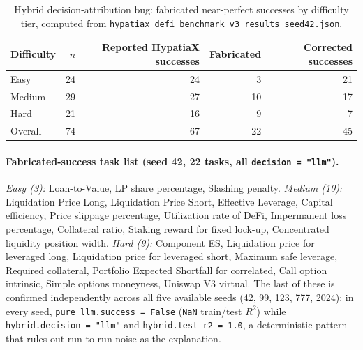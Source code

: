 \documentclass[twoside,11pt]{article}
\newcommand{\Rsq}{R^{2}}
\begin{document}
\begin{table}[h]
\centering
\caption{Hybrid decision-attribution bug: fabricated near-perfect successes by
difficulty tier, computed from \texttt{hypatiax\_defi\_benchmark\_v3\_results\_seed42.json}.}
\label{tab:hybrid-bug-breakdown}
\begin{tabular}{lrrrr}
\toprule
Difficulty & $n$ & Reported HypatiaX successes & Fabricated & Corrected successes \\
\midrule
Easy    & 24 & 24 & 3 & 21 \\
Medium  & 29 & 27 & 10 & 17 \\
Hard    & 21 & 16 & 9 & 7 \\
\midrule
Overall & 74 & 67 & 22 & 45 \\
\bottomrule
\end{tabular}
\end{table}

\paragraph{Fabricated-success task list (seed 42, 22 tasks, all
\texttt{decision = "llm"}).} \emph{Easy (3):} Loan-to-Value, LP share
percentage, Slashing penalty. \emph{Medium (10):} Liquidation Price Long,
Liquidation Price Short, Effective Leverage, Capital efficiency, Price
slippage percentage, Utilization rate of DeFi, Impermanent loss percentage,
Collateral ratio, Staking reward for fixed lock-up, Concentrated liquidity
position width. \emph{Hard (9):} Component ES, Liquidation price for
leveraged long, Liquidation price for leveraged short, Maximum safe
leverage, Required collateral, Portfolio Expected Shortfall for correlated,
Call option intrinsic, Simple options moneyness, Uniswap V3 virtual.
The last of these is confirmed independently across all five available
seeds (42, 99, 123, 777, 2024): in every seed, \texttt{pure\_llm.success =
False} (\texttt{NaN} train/test $\Rsq$) while \texttt{hybrid.decision = "llm"}
and \texttt{hybrid.test\_r2 = 1.0}, a deterministic pattern that rules out
run-to-run noise as the explanation.
\end{document}
